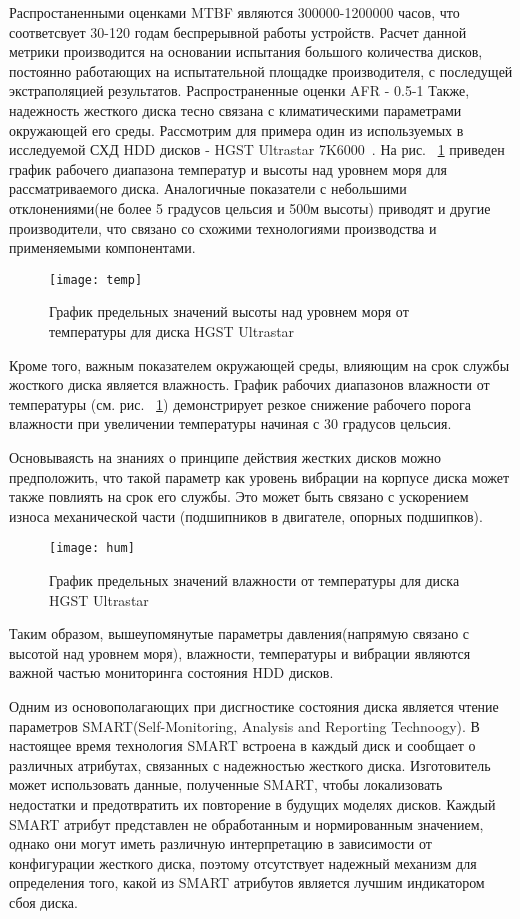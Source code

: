 Распростаненными оценками MTBF являются 300000-1200000 часов, что соответсвует 30-120 годам беспрерывной работы устройств. Расчет данной метрики производится на основании испытания большого количества дисков, постоянно работающих на испытательной площадке производителя, с последущей экстраполяцией результатов. 
Распространенные оценки AFR - 0.5-1%
Также, надежность жесткого диска тесно связана с климатическими параметрами окружающей его среды. 
Рассмотрим для примера один из используемых в исследуемой СХД HDD дисков - HGST Ultrastar 7K6000~\cite{HGST}. На рис. ~\ref{fig:temp} приведен график рабочего диапазона температур и высоты над уровнем моря для рассматриваемого диска. Аналогичные показатели с небольшими отклонениями(не более 5 градусов цельсия и 500м высоты) приводят и другие производители, что связано со схожими технологиями производства и применяемыми компонентами. 

\begin{figure}[!h]
	\centering
	\texttt{[image: temp]}
	\caption{График предельных значений высоты над уровнем моря от температуры для диска HGST Ultrastar}
	\label{fig:temp}
\end{figure}

Кроме того, важным показателем окружающей среды, влияющим на срок службы жосткого диска является влажность. График рабочих диапазонов влажности от температуры (см. рис. ~\ref{fig:temp}) демонстрирует резкое снижение рабочего порога влажности при увеличении температуры начиная с 30 градусов цельсия. 

Основываясть на знаниях о принципе действия жестких дисков можно предположить, что такой параметр как уровень вибрации на корпусе диска может также повлиять на срок его службы. Это может быть связано с ускорением износа механической части (подшипников в двигателе, опорных подшипков).

\begin{figure}[!h]
	\centering
	\texttt{[image: hum]}
	\caption{График предельных значений влажности от температуры для диска HGST Ultrastar}
	\label{fig:hum}
\end{figure}

Таким образом, вышеупомянутые параметры давления(напрямую связано с высотой над уровнем моря), влажности, температуры и вибрации являются важной частью мониторинга состояния HDD дисков. 

Одним из основополагающих при дисгностике состояния диска является чтение параметров SMART(Self-Monitoring, Analysis and Reporting Technoogy). В настоящее время 
технология  SMART  встроена  в  каждый  диск  и  сообщает  о  различных 
атрибутах,  связанных  с  надежностью  жесткого  диска. Изготовитель  может 
использовать данные, полученные SMART, чтобы локализовать недостатки и 
предотвратить их повторение в будущих моделях дисков. Каждый SMART 
атрибут   представлен   не обработанным и нормированным значением, однако они могут иметь различную интерпретацию в зависимости 
от конфигурации жесткого диска, поэтому отсутствует надежный механизм 
для  определения  того,  какой  из  SMART  атрибутов  является  лучшим 
индикатором сбоя диска. 

